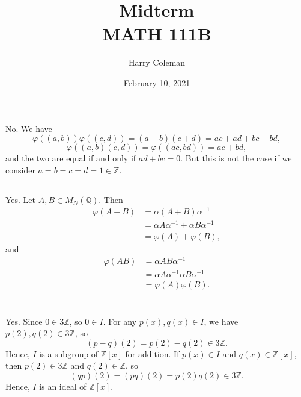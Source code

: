 \documentclass[12pt]{article}
\title{\vspace{-0.5in}Midterm \\
    \large MATH 111B
}
\author{Harry Coleman}
\date{February 10, 2021}
\theoremstyle{definition}
\newcommand{\Z}{\mathbb{Z}}
\newcommand{\Q}{\mathbb{Q}}
\renewcommand{\phi}{\varphi}
\begin{document}
\maketitle


\section{}

\subsection{}

No. We have
\[
    \phi((a,b))\phi((c,d))
        = (a + b)(c + d)
        = ac + ad + bc + bd,
\]
\[
    \phi((a,b)(c,d))
        = \phi((ac,bd))
        = ac + bd,
\]
and the two are equal if and only if $ad + bc = 0$. But this is not the case if we consider $a=b=c=d=1 \in \Z$.

\subsection{}

Yes. Let $A, B \in M_N(\Q)$. Then
\begin{align*}
    \phi(A + B) 
        &= \alpha(A + B)\alpha^{-1} \\
        &= \alpha A \alpha^{-1} + \alpha B \alpha^{-1} \\
        &= \phi(A) + \phi(B),
\end{align*}
and
\begin{align*}
    \phi(AB) 
        &= \alpha AB \alpha^{-1} \\
        &= \alpha A \alpha^{-1} \alpha B \alpha^{-1} \\
        &= \phi(A) \phi(B).
\end{align*}



\newpage
\section{}

\subsection{}

Yes. Since $0 \in 3\Z$, so $0 \in I$. For any $p(x), q(x) \in I$, we have $p(2), q(2) \in 3\Z$, so
\[
    (p - q)(2) = p(2) - q(2) \in 3\Z.
\]
Hence, $I$ is a subgroup of $\Z[x]$ for addition. If $p(x) \in I$ and $q(x) \in \Z[x]$, then $p(2) \in 3\Z$ and $q(2) \in \Z$, so
\[
    (qp)(2) = (pq)(2) = p(2)q(2) \in 3\Z.
\]
Hence, $I$ is an ideal of $\Z[x]$.
\end{document}
